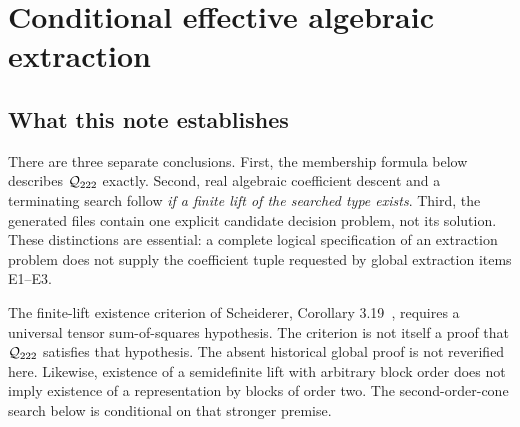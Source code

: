 \section{Conditional effective algebraic extraction}
\subsection{What this note establishes}
There are three separate conclusions. First, the membership formula below describes ${\mathcal Q_{222}}$ exactly. Second, real algebraic coefficient descent and a terminating search follow \emph{if a finite lift of the searched type exists}. Third, the generated files contain one explicit candidate decision problem, not its solution. These distinctions are essential: a complete logical specification of an extraction problem does not supply the coefficient tuple requested by global extraction items E1--E3.

The finite-lift existence criterion of Scheiderer, Corollary 3.19~\cite{Scheiderer}, requires a universal tensor sum-of-squares hypothesis. The criterion is not itself a proof that ${\mathcal Q_{222}}$ satisfies that hypothesis. The absent historical global proof is not reverified here. Likewise, existence of a semidefinite lift with arbitrary block order does not imply existence of a representation by blocks of order two. The second-order-cone search below is conditional on that stronger premise.

